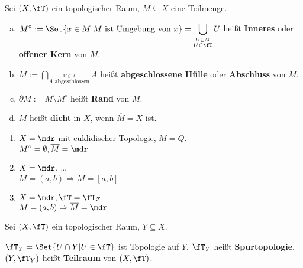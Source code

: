 \begin{definition}
    Sei $(X, \fT)$ ein topologischer Raum, $M \subseteq X$ eine Teilmenge.
    \begin{enumerate}[a)]
        \item $\displaystyle M^\circ := \Set{x \in M | M \text{ ist Umgebung von } x} = \bigcup_{\stackrel{U \subseteq M} {U \in \fT}} U $ heißt \textbf{Inneres} oder \textbf{ offener Kern} von $M$.  
        \item $\displaystyle \overline{M} := \bigcap_{\stackrel{M \subseteq A}{A \text{ abgeschlossen}}} A$ heißt \textbf{abgeschlossene Hülle} oder \textbf{Abschluss} von $M$. 
        \item $\partial M := \overline{M} \setminus M^\circ$ heißt \textbf{Rand} von $M$. 
        \item $M$ heißt \textbf{dicht} in $X$, wenn $\overline{M} = X$ ist. 
    \end{enumerate}
\end{definition}

\begin{beispieleX}
    \begin{enumerate}[1)]
        \item $X = \mdr$ mit euklidischer Topologie, $M = Q$. \\
              $M^\circ = \emptyset, \overline{M} = \mdr$
        \item $X = \mdr$, \dots\\
              $M = (a, b) \Rightarrow \overline{M} = [a, b]$
        \item $X = \mdr, \fT = \fT_Z$ \\
              $M = (a, b) \Rightarrow \overline{M} = \mdr$
    \end{enumerate}
\end{beispieleX}

\begin{definition}  
    Sei $(X, \fT)$ ein topologischer Raum, $Y \subseteq X$.

    $\fT_Y = \Set{U \cap Y | U \in \fT}$ ist Topologie auf $Y$.
    $\fT_Y$ heißt \textbf{Spurtopologie}.
    $(Y, \fT_Y)$ heißt \textbf{Teilraum} von $(X, \fT)$.
\end{definition}
